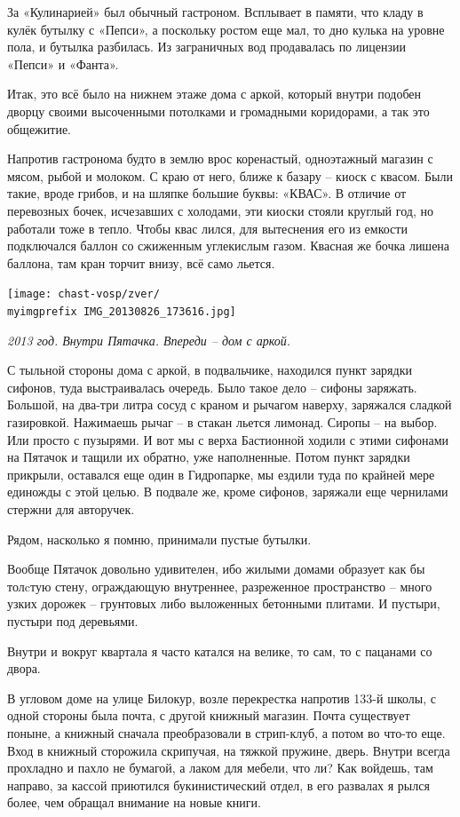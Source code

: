 За «Кулинарией» был обычный гастроном. Всплывает в памяти, что кладу в кулёк бутылку с «Пепси», а поскольку ростом еще мал, то дно кулька на уровне пола, и бутылка разбилась. Из заграничных вод продавалась по лицензии «Пепси» и «Фанта».

Итак, это всё было на нижнем этаже дома с аркой, который внутри подобен дворцу своими высоченными потолками и громадными коридорами, а так это общежитие.

Напротив гастронома будто в землю врос коренастый, одноэтажный магазин с мясом, рыбой и молоком. С краю от него, ближе к базару – киоск с квасом. Были такие, вроде грибов, и на шляпке большие буквы: «КВАС». В отличие от перевозных бочек, исчезавших с холодами, эти киоски стояли круглый год, но работали тоже в тепло. Чтобы квас лился, для вытеснения его из емкости подключался баллон со сжиженным углекислым газом. Квасная же бочка лишена баллона, там кран торчит внизу, всё само льется.


\begin{center}
\texttt{[image: chast-vosp/zver/\\myimgprefix IMG\_20130826\_173616.jpg]}

\textit{2013 год. Внутри Пятачка. Впереди – дом с аркой.}
\end{center}

С тыльной стороны дома с аркой, в подвальчике, находился пункт зарядки сифонов, туда выстраивалась очередь. Было такое дело – сифоны заряжать. Большой, на два-три литра сосуд с краном и рычагом наверху, заряжался сладкой газировкой. Нажимаешь рычаг – в стакан льется лимонад. Сиропы – на выбор. Или просто с пузырями. И вот мы с верха Бастионной ходили с этими сифонами на Пятачок и тащили их обратно, уже наполненные. Потом пункт зарядки прикрыли, оставался еще один в Гидропарке, мы ездили туда по крайней мере единожды с этой целью. В подвале же, кроме сифонов, заряжали еще чернилами стержни для авторучек.

Рядом, насколько я помню, принимали пустые бутылки.

Вообще Пятачок довольно удивителен, ибо жилыми домами образует как бы толcтую стену, ограждающую внутреннее, разреженное пространство – много узких дорожек – грунтовых либо выложенных бетонными плитами. И пустыри, пустыри под деревьями.
 
Внутри и вокруг квартала я часто катался на велике, то сам, то с пацанами со двора. 

В угловом доме на улице Билокур, возле перекрестка напротив 133-й школы, с одной стороны была почта, с другой книжный магазин. Почта существует поныне, а книжный сначала преобразовали в стрип-клуб, а потом во что-то еще. Вход в книжный сторожила скрипучая, на тяжкой пружине, дверь. Внутри всегда прохладно и пахло не бумагой, а лаком для мебели, что ли? Как войдешь, там направо, за кассой приютился букинистический отдел, в его развалах я рылся более, чем обращал внимание на новые книги.

